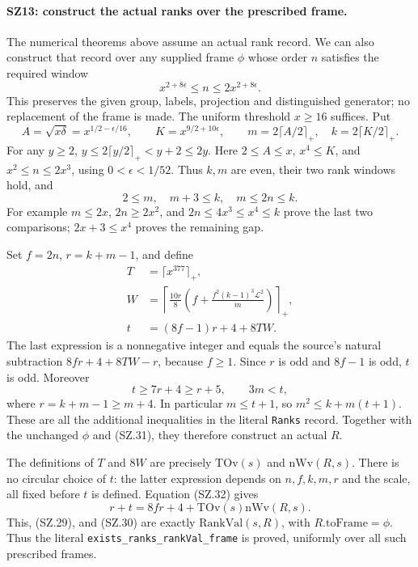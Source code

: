 \paragraph{SZ13: construct the actual ranks over the prescribed frame.}
The numerical theorems above assume an actual rank record. We can also
construct that record over any supplied frame $\phi$ whose order $n$
satisfies the required window
\[
             x^{2+8\epsilon}\leq n\leq2x^{2+8\epsilon}.
                                                                    \tag{SZ.29}
\]
This preserves the given group, labels, projection and distinguished
generator; no replacement of the frame is made. The uniform threshold
$x\geq16$ suffices. Put
\[
 A=\sqrt{x\delta}=x^{1/2-\epsilon/16},\qquad
 K=x^{9/2+10\epsilon},\qquad
          m=2\lceil A/2\rceil_+,\quad k=2\lceil K/2\rceil_+.
                                                                    \tag{SZ.30}
\]
For any $y\geq2$, $y\leq2\lceil y/2\rceil_+<y+2\leq2y$.
Here $2\leq A\leq x$, $x^4\leq K$, and
$x^2\leq n\leq2x^3$, using $0<\epsilon<1/52$.
Thus $k,m$ are even, their two rank windows hold, and
\[
       2\leq m,\quad m+3\leq k,\quad m\leq2n\leq k.
                                                                    \tag{SZ.31}
\]
For example $m\leq2x$, $2n\geq2x^2$, and
$2n\leq4x^3\leq x^4\leq k$ prove the last two comparisons;
$2x+3\leq x^4$ proves the remaining gap.

Set $f=2n$, $r=k+m-1$, and define
\[
 \begin{split}
 T&=\lceil x^{377}\rceil_+,\\
 W&=\left\lceil\frac{10r}{8}
       \left(f+\frac{f^2(k-1)^3\mathcal L^2}{m}\right)
                                                    \right\rceil_+,\\
 t&=(8f-1)r+4+8TW.
 \end{split}                                                    \tag{SZ.32}
\]
The last expression is a nonnegative integer and equals the source's
natural subtraction $8fr+4+8TW-r$, because $f\geq1$.
Since $r$ is odd and $8f-1$ is odd, $t$ is odd. Moreover
\[
             t\geq7r+4\geq r+5,\qquad 3m<t,
\]
where $r=k+m-1\geq m+4$. In particular $m\leq t+1$, so
$m^2\leq k+m(t+1)$. These are all the additional inequalities
in the literal \texttt{Ranks} record. Together with the unchanged
$\phi$ and (SZ.31), they therefore construct an actual $R$.

The definitions of $T$ and $8W$ are precisely $\mathrm{TOv}(s)$ and
$\mathrm{nWv}(R,s)$. There is no circular choice of $t$: the latter
expression depends on $n,f,k,m,r$ and the scale, all fixed before
$t$ is defined. Equation (SZ.32) gives
\[
             r+t=8fr+4+\mathrm{TOv}(s)\mathrm{nWv}(R,s).
                                                                    \tag{SZ.33}
\]
This, (SZ.29), and (SZ.30) are exactly
$\mathrm{RankVal}(s,R)$, with $R.\mathrm{toFrame}=\phi$.
Thus the literal \texttt{exists\_ranks\_rankVal\_frame} is
proved, uniformly over all such prescribed frames.

